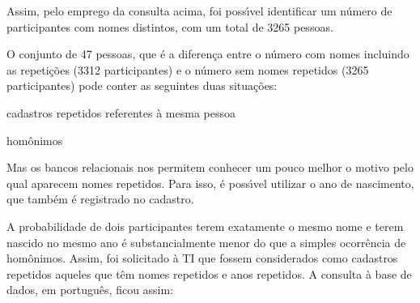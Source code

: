 \documentclass[
12pt,		%
openright,	%
twoside,  %
a4paper,			%
chapter=TITLE,		%
english,			%
french,				%
spanish,			%
brazil				%
]{USPSC-classe/USPSC_RedarTex}
\begin{document}
\noindent\begin{center}\mbox{\centering{}}\end{center}













Assim, pelo emprego da consulta acima, foi poss\'{\i}vel identificar um n\'umero de participantes com nomes distintos, com um total de 3265 pessoas.










O conjunto de 47 pessoas, que \'e a diferen\c{c}a entre o n\'umero com nomes incluindo as repeti\c{c}\~oes (3312 participantes) e o n\'umero sem nomes repetidos (3265 participantes) pode conter as seguintes duas situa\c{c}\~oes:











\begin{alineas}
\item cadastros repetidos referentes \`a mesma pessoa
\item hom\^onimos
\end{alineas}

Mas os bancos relacionais nos permitem conhecer um pouco melhor o motivo pelo qual aparecem nomes repetidos. Para isso, \'e poss\'{\i}vel utilizar o ano de nascimento, que tamb\'em \'e registrado no cadastro.










A probabilidade de dois participantes terem exatamente o mesmo nome e terem nascido no mesmo ano \'e substancialmente menor do que a simples ocorr\^encia de hom\^onimos. Assim, foi solicitado \`a TI que fossem considerados como cadastros repetidos aqueles que t\^em nomes repetidos e anos repetidos. A consulta \`a base de dados, em portugu\^es, ficou assim:
\end{document}
